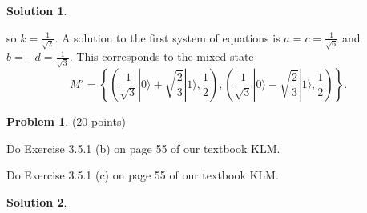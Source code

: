 \documentclass{article}
\theoremstyle{definition}
\newtheorem{problem}{Problem}
\newtheorem*{solution}{Solution}
\newcommand{\ket}[1]{|#1\rangle}
\begin{document}
\begin{solution}
\begin{compactenum}[(a)]
so $k = \frac{1}{\sqrt{2}}$.  A solution to the first system of equations is $a = c = \frac{1}{\sqrt{6}}$ and $b = -d = \frac{1}{\sqrt{3}}$.  This corresponds to the mixed state
$$M' = \left\{ \left( \frac{1}{\sqrt{3}}\ket{0} + \sqrt{\frac{2}{3}} \ket{1}, \frac{1}{2} \right), \left(\frac{1}{\sqrt{3}} \ket{0} - \sqrt{\frac{2}{3}} \ket{1}, \frac{1}{2} \right)\right\}.$$                   
\end{compactenum}
\end{solution}

\begin{problem}{(20 points)}
\begin{compactenum}[(a)]
\item Do Exercise 3.5.1 (b) on page 55 of our textbook KLM.
\item Do Exercise 3.5.1 (c) on page 55 of our textbook KLM.
\end{compactenum}
\end{problem}
\begin{solution}
\end{solution}
\end{document}
